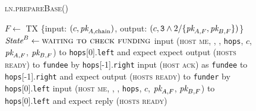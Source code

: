 \begin{figure}[H]
  \begin{processbox}{\textsc{ln.prepareBase}()}
    \begin{algorithmic}[1]
       
        \State $F \gets$ TX \{input: $(c, \textit{pk}_{A, \mathrm{chain}})$, output: $(c,
        \texttt{3} \wedge 2/\{\textit{pk}_{A, F}, \textit{pk}_{B, F}\})$\}
        \label{code:ln:base:create-funding}
          \State $\textit{State}^B \gets \textsc{waiting to check funding}$
        \EndIf
      \Else \: 
          \State input (\textsc{host me}, \alice, \bob, \texttt{hops}, $c$,
          $\textit{pk}_{A, F}$, $\textit{pk}_{B, F}$) to \texttt{hops}[0].\texttt{left} and expect
          expect output (\textsc{hosts ready}) to \texttt{fundee} by
          \texttt{hops}[-1].\texttt{right} 
          \State input (\textsc{host ack}) as \texttt{fundee} to
          \texttt{hops}[-1].\texttt{right} and expect output (\textsc{hosts
          ready}) to \texttt{funder} by \texttt{hops}[0].\texttt{left}
        \Else \: 
          \State input (\textsc{host me}, \alice, \bob, \texttt{hops}, $c$,
          $\textit{pk}_{A, F}$, $\textit{pk}_{B, F}$) to \texttt{hops}[0].\texttt{left} and expect
          reply (\textsc{hosts ready}) 
        \EndIf
      \EndIf
    \end{algorithmic}
  \end{processbox}
  \caption{}
  \label{code:ln:prepare-base}
\end{figure}

